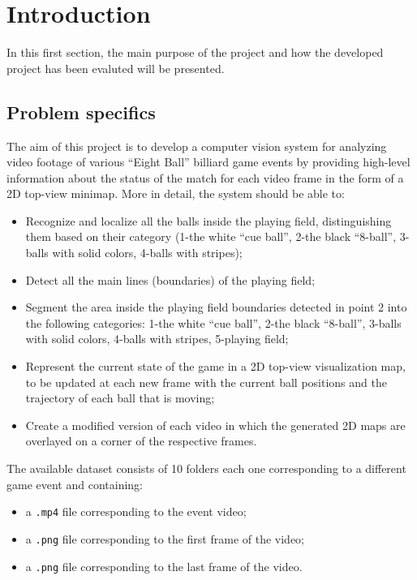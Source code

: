 \section{Introduction}

In this first section, the main purpose of the project and how the developed project has been evaluted will be presented.


\subsection{Problem specifics}
The aim of this project is to develop a computer vision system for analyzing video footage of various “Eight Ball”
billiard game events by providing high-level information about the status of the match for each video frame in the form of a 
2D top-view minimap.
\newline
More in detail, the system should be able to:
\begin{itemize}
    \item Recognize and localize all the balls inside the playing field, distinguishing them based on their category (1-the
    white “cue ball”, 2-the black “8-ball”, 3-balls with solid colors, 4-balls with stripes);
    \item Detect all the main lines (boundaries) of the playing field;
    \item Segment the area inside the playing field boundaries detected in point 2 into the following categories: 1-the
    white “cue ball”, 2-the black “8-ball”, 3-balls with solid colors, 4-balls with stripes, 5-playing field;
    \item Represent the current state of the game in a 2D top-view visualization map, to be updated at each new frame
    with the current ball positions and the trajectory of each ball that is moving;
    \item Create a modified version of each video in which the generated 2D maps are 
    overlayed on a corner of the respective frames.
\end{itemize}

\begin{flushleft}
The available dataset consists of 10 folders each one corresponding to a different game event and containing:
\end{flushleft}
\begin{itemize}
    \item a \verb|.mp4| file corresponding to the event video;
    \item a \verb|.png| file corresponding to the first frame of the video;
    \item a \verb|.png| file corresponding to the last frame of the video.
\end{itemize}

